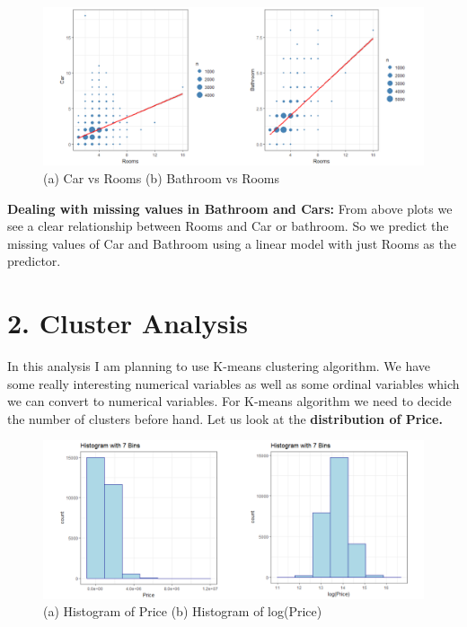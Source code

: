 \documentclass[]{article}
\begin{document}
\begin{figure}
\centering
\includegraphics{Report_files/figure-latex/unnamed-chunk-6-1.pdf}
\caption{(a) Car vs Rooms (b) Bathroom vs Rooms}
\end{figure}

\textbf{Dealing with missing values in Bathroom and Cars:} From above
plots we see a clear relationship between Rooms and Car or bathroom. So
we predict the missing values of Car and Bathroom using a linear model
with just Rooms as the predictor.

\pagebreak

\section{2. Cluster Analysis}\label{cluster-analysis}

In this analysis I am planning to use K-means clustering algorithm. We
have some really interesting numerical variables as well as some ordinal
variables which we can convert to numerical variables. For K-means
algorithm we need to decide the number of clusters before hand. Let us
look at the \textbf{distribution of Price.}

\begin{figure}
\centering
\includegraphics{Report_files/figure-latex/unnamed-chunk-7-1.pdf}
\caption{(a) Histogram of Price (b) Histogram of log(Price)}
\end{figure}
\end{document}
